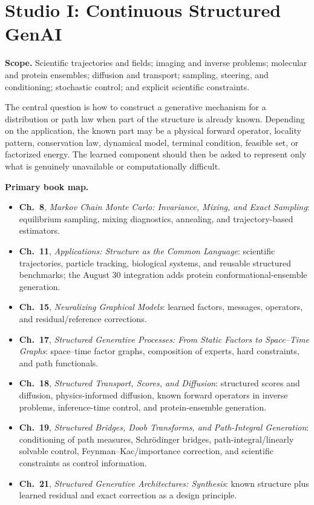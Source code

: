 \documentclass[11pt]{article}
\newcommand{\studio}[1]{\section{#1}}
\newcommand{\bookch}[1]{\textbf{Ch.~#1}}
\begin{document}
\studio{Studio I: Continuous Structured GenAI}

\textbf{Scope.} Scientific trajectories and fields; imaging and inverse problems; molecular and protein ensembles; diffusion and transport; sampling, steering, and conditioning; stochastic control; and explicit scientific constraints.

The central question is how to construct a generative mechanism for a distribution or path law when part of the structure is already known. Depending on the application, the known part may be a physical forward operator, locality pattern, conservation law, dynamical model, terminal condition, feasible set, or factorized energy. The learned component should then be asked to represent only what is genuinely unavailable or computationally difficult.

\textbf{Primary book map.}
\begin{itemize}
    \item \bookch{8}, \emph{Markov Chain Monte Carlo: Invariance, Mixing, and Exact Sampling}: equilibrium sampling, mixing diagnostics, annealing, and trajectory-based estimators.
    \item \bookch{11}, \emph{Applications: Structure as the Common Language}: scientific trajectories, particle tracking, biological systems, and reusable structured benchmarks; the August 30 integration adds protein conformational-ensemble generation.
    \item \bookch{15}, \emph{Neuralizing Graphical Models}: learned factors, messages, operators, and residual/reference corrections.
    \item \bookch{17}, \emph{Structured Generative Processes: From Static Factors to Space--Time Graphs}: space--time factor graphs, composition of experts, hard constraints, and path functionals.
    \item \bookch{18}, \emph{Structured Transport, Scores, and Diffusion}: structured scores and diffusion, physics-informed diffusion, known forward operators in inverse problems, inference-time control, and protein-ensemble generation.
    \item \bookch{19}, \emph{Structured Bridges, Doob Transforms, and Path-Integral Generation}: conditioning of path measures, Schr\"odinger bridges, path-integral/linearly solvable control, Feynman--Kac/importance correction, and scientific constraints as control information.
    \item \bookch{21}, \emph{Structured Generative Architectures: Synthesis}: known structure plus learned residual and exact correction as a design principle.
\end{itemize}
\end{document}
